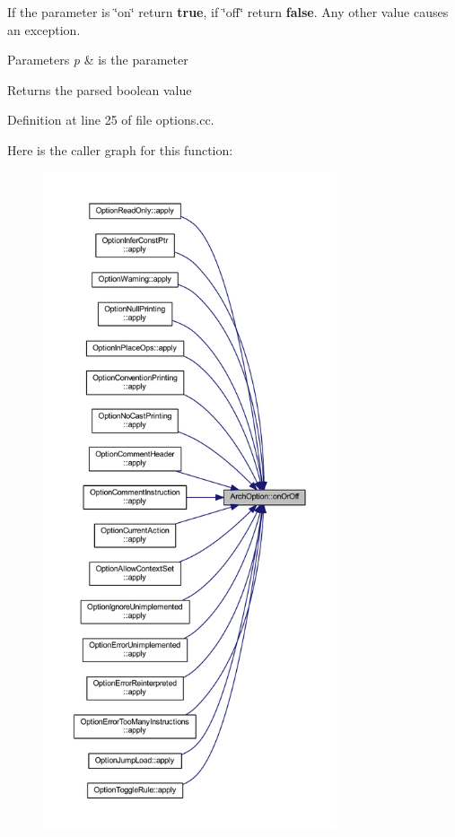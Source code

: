 If the parameter is \char`\"{}on\char`\"{} return {\bfseries{true}}, if \char`\"{}off\char`\"{} return {\bfseries{false}}. Any other value causes an exception. 
\begin{DoxyParams}{Parameters}
{\em p} & is the parameter \\
\hline
\end{DoxyParams}
\begin{DoxyReturn}{Returns}
the parsed boolean value 
\end{DoxyReturn}


Definition at line 25 of file options.\+cc.

Here is the caller graph for this function\+:
\nopagebreak
\begin{figure}[H]
\begin{center}
\leavevmode
\includegraphics[height=550pt]{class_arch_option_a20449a316e535886478bb1b73ac5ee68_icgraph}
\end{center}
\end{figure}


